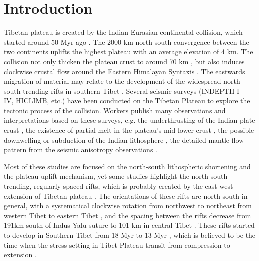 \section{Introduction}

Tibetan plateau is created by the Indian-Eurasian continental collision, which started around 50 Myr ago \cite{Patriat_1984}. The 2000-km north-south convergence between the two continents uplifts the highest plateau with an average elevation of 4 km. The collision not only thicken the plateau crust to around 70 km \cite[e.g.][]{Nabelek_2009}, but also induces clockwise crustal flow around the Eastern Himalayan Syntaxis \cite{Gan_2007}. The eastwards migration of material may relate to the development of the widespread north-south trending rifts in southern Tibet \cite[e.g.][]{Yin_2000,Zhang_2013}. 
Several seismic surveys (INDEPTH I - IV, HICLIMB, etc.) have been conducted on the Tibetan Plateau to explore the tectonic process of the collision. Workers publish many observations and interpretations based on these surveys, e.g. the underthrusting of the Indian plate crust \cite{Zhao_1993}, the existence of partial melt in the plateau’s mid-lower crust \cite{Brown_1996}, the possible downwelling or subduction of the Indian lithosphere \cite[e.g.][]{Tilmann_2003,Li_2008,Nabelek_2009}, the detailed mantle flow pattern from the seismic anisotropy observations \cite[e.g.][]{Hirn_1995,Huang_2000,Fu_2008}.

Most of these studies are focused on the north-south lithospheric shortening and the plateau uplift mechanism, yet some studies highlight the north-south trending, regularly spaced rifts, which is probably created by the east-west extension of Tibetan plateau \cite[e.g.][]{Molnar_1978,Armijo_1986,Yin_2000,Kapp_2004,Kapp_2008}. The orientations of these rifts are north-south in general, with a systematical clockwise rotation from northwest to northeast from western Tibet to eastern Tibet \cite{Kapp_2004}, and the spacing between the rifts decrease from 191km south of Indus-Yalu suture to 101 km in central Tibet \cite{Yin_2000}. These rifts started to develop in Southern Tibet from 18 Myr to 13 Myr \cite{Williams_2001}, which is believed to be the time when the stress setting in Tibet Plateau transit from compression to extension \cite{Kapp_2005}.

